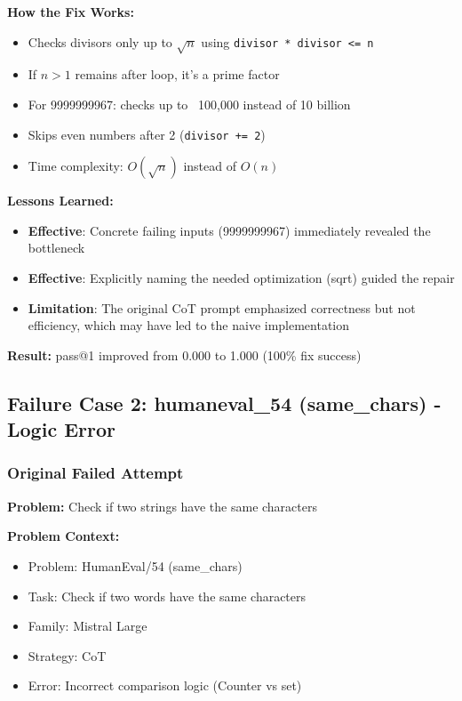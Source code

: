 \documentclass[11pt]{article}
\begin{document}
\textbf{How the Fix Works:}
\begin{itemize}
    \item Checks divisors only up to $\sqrt{n}$ using \texttt{divisor * divisor <= n}
    \item If $n > 1$ remains after loop, it's a prime factor
    \item For 9999999967: checks up to ~100,000 instead of 10 billion
    \item Skips even numbers after 2 (\texttt{divisor += 2})
    \item Time complexity: $O(\sqrt{n})$ instead of $O(n)$
\end{itemize}

\textbf{Lessons Learned:}
\begin{itemize}
    \item \textbf{Effective}: Concrete failing inputs (9999999967) immediately revealed the bottleneck
    \item \textbf{Effective}: Explicitly naming the needed optimization (sqrt) guided the repair
    \item \textbf{Limitation}: The original CoT prompt emphasized correctness but not efficiency, which may have led to the naive implementation
\end{itemize}

\textbf{Result:} pass@1 improved from 0.000 to 1.000 (100\% fix success)

\subsection{Failure Case 2: humaneval\_54 (same\_chars) - Logic Error}

\subsubsection{Original Failed Attempt}

\textbf{Problem:} Check if two strings have the same characters

\textbf{Problem Context:}
\begin{itemize}
    \item Problem: HumanEval/54 (same\_chars)
    \item Task: Check if two words have the same characters
    \item Family: Mistral Large
    \item Strategy: CoT
    \item Error: Incorrect comparison logic (Counter vs set)
\end{itemize}
\end{document}

